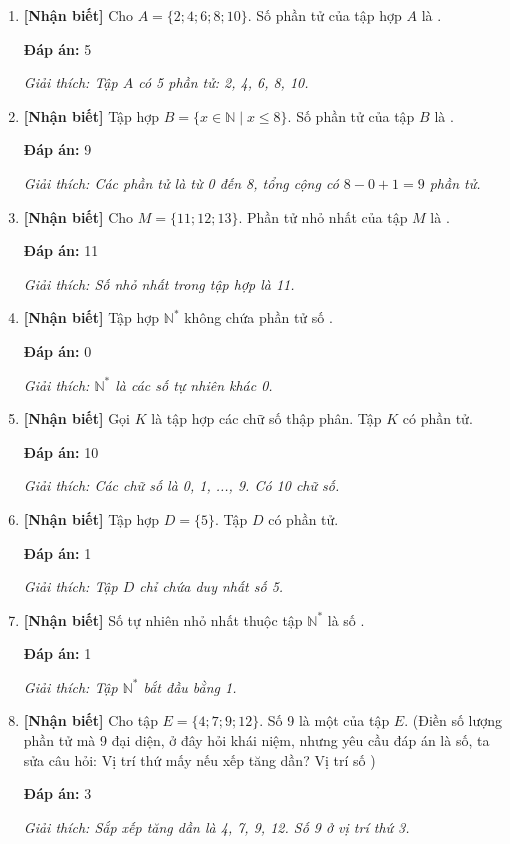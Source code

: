 \documentclass[12pt,a4paper]{article}
\newcommand{\nhanbiet}{\textcolor{nhanbiet}{\textbf{[Nhận biết]}}}
\newcommand{\dapan}[1]{\par\smallskip\textbf{Đáp án:} #1}
\newcommand{\giaithich}[1]{\par\textit{Giải thích: #1}}
\begin{document}
\begin{enumerate}[label=\textbf{Câu \arabic*.},resume]
    \item \nhanbiet{} Cho $A = \{2; 4; 6; 8; 10\}$. Số phần tử của tập hợp $A$ là \underline{\hspace{2cm}}.
    \dapan{5}
    \giaithich{Tập $A$ có 5 phần tử: 2, 4, 6, 8, 10.}

    \item \nhanbiet{} Tập hợp $B = \{x \in \mathbb{N} \mid x \le 8\}$. Số phần tử của tập $B$ là \underline{\hspace{2cm}}.
    \dapan{9}
    \giaithich{Các phần tử là từ 0 đến 8, tổng cộng có $8 - 0 + 1 = 9$ phần tử.}

    \item \nhanbiet{} Cho $M = \{11; 12; 13\}$. Phần tử nhỏ nhất của tập $M$ là \underline{\hspace{2cm}}.
    \dapan{11}
    \giaithich{Số nhỏ nhất trong tập hợp là 11.}

    \item \nhanbiet{} Tập hợp $\mathbb{N}^*$ không chứa phần tử số \underline{\hspace{2cm}}.
    \dapan{0}
    \giaithich{$\mathbb{N}^*$ là các số tự nhiên khác 0.}

    \item \nhanbiet{} Gọi $K$ là tập hợp các chữ số thập phân. Tập $K$ có \underline{\hspace{2cm}} phần tử.
    \dapan{10}
    \giaithich{Các chữ số là 0, 1, ..., 9. Có 10 chữ số.}

    \item \nhanbiet{} Tập hợp $D = \{5\}$. Tập $D$ có \underline{\hspace{2cm}} phần tử.
    \dapan{1}
    \giaithich{Tập $D$ chỉ chứa duy nhất số 5.}

    \item \nhanbiet{} Số tự nhiên nhỏ nhất thuộc tập $\mathbb{N}^*$ là số \underline{\hspace{2cm}}.
    \dapan{1}
    \giaithich{Tập $\mathbb{N}^*$ bắt đầu bằng 1.}

    \item \nhanbiet{} Cho tập $E = \{4; 7; 9; 12\}$. Số 9 là một \underline{\hspace{2cm}} của tập $E$. (Điền số lượng phần tử mà 9 đại diện, ở đây hỏi khái niệm, nhưng yêu cầu đáp án là số, ta sửa câu hỏi: Vị trí thứ mấy nếu xếp tăng dần? Vị trí số \underline{\hspace{2cm}})
    \dapan{3}
    \giaithich{Sắp xếp tăng dần là 4, 7, 9, 12. Số 9 ở vị trí thứ 3.}


\end{enumerate}
\end{document}
